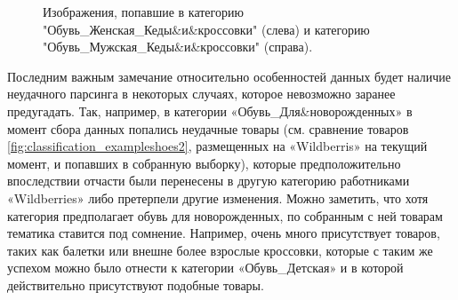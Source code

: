 \documentclass[a4paper,12pt]{extarticle}
\begin{document}
\begin{figure}[ht]
\begin{minipage}[b]{3in}
	\end{minipage}
	\caption{Изображения, попавшие в категорию "Обувь\_Женская\_Кеды\&и\&кроссовки" (слева) и  категорию "Обувь\_Мужская\_Кеды\&и\&кроссовки" (справа).}
	\label{fig:classification_exampleshoes}
\end{figure}

Последним важным замечание относительно особенностей данных будет наличие неудачного парсинга в некоторых случаях, которое невозможно заранее предугадать. Так, например, в категории «Обувь\_Для\&новорожденных» в момент сбора данных попались неудачные товары (см. сравнение товаров \ref{fig:classification_exampleshoes2}, размещенных на «Wildberris» на текущий момент, и попавших в собранную выборку), которые предположительно впоследствии отчасти были перенесены в другую категорию работниками «Wildberries» либо претерпели другие изменения. Можно заметить, что хотя категория предполагает обувь для новорожденных, по собранным с ней товарам тематика ставится под сомнение. Например, очень много присутствует товаров, таких как балетки или внешне более взрослые кроссовки, которые с таким же успехом можно было отнести к категории «Обувь\_Детская» и в которой действительно присутствуют подобные товары.
\end{document}
